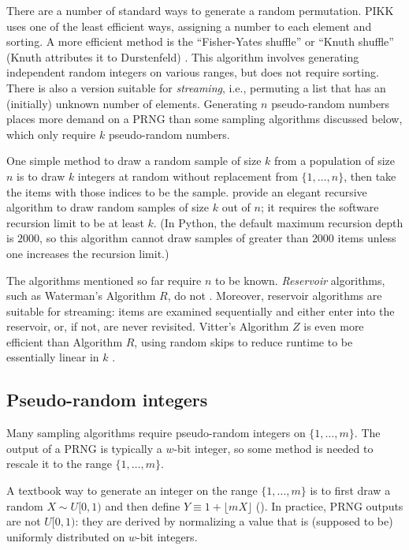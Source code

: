 \documentclass[graybox]{svmult}
\begin{document}
There are a number of standard ways to generate a random permutation.
PIKK uses one of the least efficient ways, assigning a number to each element and sorting.
A more efficient method is the ``Fisher-Yates shuffle'' or ``Knuth shuffle'' (Knuth attributes it to Durstenfeld) \cite{knuth_art_1997}.
This algorithm involves generating independent random integers on various ranges, but does not require sorting.
There is also a version suitable for \emph{streaming}, i.e., permuting a list that has an (initially) unknown number of elements.
Generating $n$ pseudo-random numbers places more demand on a PRNG than some sampling algorithms discussed below, which only require $k$ pseudo-random numbers.

One simple method to draw a random sample of size $k$ from a population of size $n$
is to draw $k$ integers at random without replacement from  $\{1, \ldots, n\}$, then take the items with those indices to be the sample.
\cite{cormen_introduction_2009} provide an elegant recursive algorithm to draw random samples of size $k$ out of $n$; it requires the software recursion limit to be at least $k$.
(In Python, the default maximum recursion depth is $2000$, so this algorithm cannot draw samples of greater than $2000$ items unless one increases the recursion limit.)

The algorithms mentioned so far require $n$ to be known.
\emph{Reservoir} algorithms, such as Waterman's Algorithm $R$, do not  \cite{knuth_art_1997}.
Moreover, reservoir algorithms are suitable for streaming: items are examined
sequentially and either enter into the reservoir, or, if not, are never revisited.
Vitter's Algorithm $Z$ is even more efficient than Algorithm $R$,
using random skips to reduce runtime to be essentially linear in $k$ \cite{vitter_random_1985}.

\subsection{Pseudo-random integers}
\label{sec:integers}
Many sampling algorithms require pseudo-random integers on $\{1, \ldots, m\}$.
The output of a PRNG is typically a $w$-bit integer, so some method is needed to rescale it to the range $\{1, \ldots, m\}$.

A textbook way to generate an integer on the range $\{1, \ldots, m\}$ is to first draw a random $X \sim U[0,1)$
and then define $Y \equiv 1 + \lfloor mX \rfloor$ (\cite{press_numerical_1988, peck_introduction_2011}). 
In practice, PRNG outputs are not $U[0,1)$: they are derived by normalizing a value that is
 (supposed to be) uniformly distributed on $w$-bit integers. 
\end{document}
